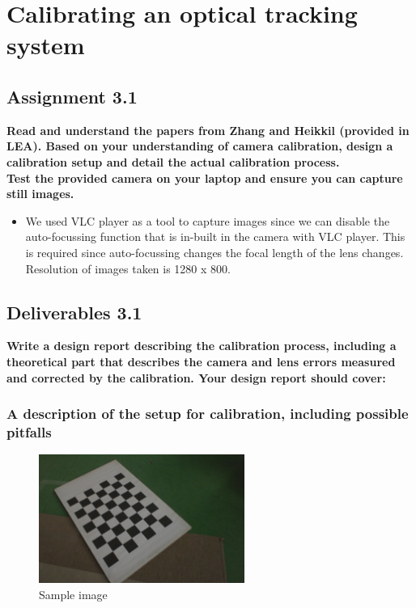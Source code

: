 \chapter{Calibrating an optical tracking system}
\section{Assignment 3.1}
\textbf{Read and understand the papers from Zhang and Heikkil (provided in LEA). Based on your understanding of camera calibration, design a calibration setup and detail the actual calibration process. \\
Test the provided camera on your laptop and ensure you can capture still images.}

\begin{itemize}
\item We used VLC player as a tool to capture images since we can disable the auto-focussing function that is in-built in the camera with VLC player. This is required since auto-focussing changes the focal length of the lens changes. Resolution of images taken is 1280 x 800.
\end{itemize}

\section{Deliverables 3.1}
\textbf{Write a design report describing the calibration process, including a theoretical part that describes the camera and lens errors measured and corrected by the calibration. Your design report should cover:}

\subsection{A description of the setup for calibration, including possible pitfalls}

\begin{figure}[H]
\begin{center}
\includegraphics[width=0.6\textwidth]{data/1.jpg}
\caption{Sample image}
\label{fig:sample}
\end{center}
\end{figure}

